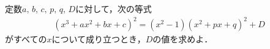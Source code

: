 \documentclass[../../main.tex]{subfiles}
\begin{document}
定数$a, \, b, \, c, \, p, \, q, \, D$に対して，次の等式
\begin{align}
  {(x^3+ax^2+bx+c)}^2=(x^2-1){(x^2+px+q)}^2+D
\end{align}
がすべての$x$について成り立つとき，$D$の値を求めよ．
\end{document}

